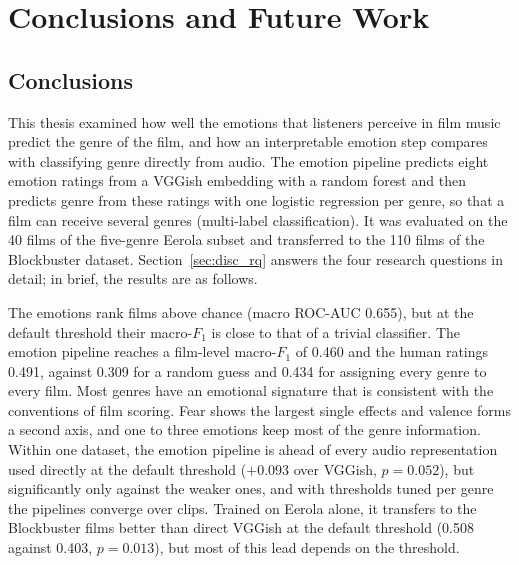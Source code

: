 \chapter{Conclusions and Future Work}
\label{ch:conclusions}


\section{Conclusions}
\label{sec:conclusions}

This thesis examined how well the emotions that listeners perceive in film music predict the genre of the film, and how an interpretable emotion step compares with classifying genre
directly from audio. The emotion pipeline predicts eight emotion ratings from a VGGish
embedding with a random forest and then predicts genre from these ratings with one
logistic regression per genre, so that a film can receive several genres (multi-label
classification). It was evaluated on the 40 films of the five-genre Eerola
subset and transferred to the 110 films of the Blockbuster dataset. Section~\ref{sec:disc_rq}
answers the four research questions in detail; in brief, the results are as follows.

The emotions rank films above chance (macro ROC-AUC 0.655), but at the default threshold their macro-$F_1$ is close to that of a trivial classifier. The emotion pipeline reaches a film-level macro-$F_1$ of 0.460 and the human ratings 0.491, against 0.309 for a random guess and 0.434 for assigning every genre to every film. Most genres have an emotional signature that is consistent with the conventions of
film scoring. Fear shows the largest single effects and valence forms a second axis, and one to
three emotions keep most of the genre information. Within one dataset, the emotion pipeline
is ahead of every audio representation used directly at the default threshold ($+0.093$
over VGGish, $p=0.052$), but significantly only against the weaker ones, and with thresholds tuned per genre the pipelines converge over clips. Trained on Eerola alone, it transfers to
the Blockbuster films better than direct VGGish at the default threshold (0.508 against
0.403, $p=0.013$), but most of this lead depends on the threshold.


